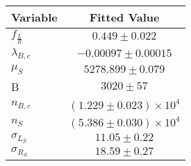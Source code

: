 \begin{tabular}[t]{lc}
\hline
Variable &Fitted Value\\
\hline\hline
$f_{\frac{L}{R}}$&$0.449\pm0.022$\\
\hline
$\lambda_{B,c}$&$-0.00097\pm0.00015$\\
\hline
$\mu_S$&$5278.899\pm0.079$\\
\hline
B&$3020\pm57$\\
\hline
$n_{B,c}$&$(1.229\pm0.023)\times 10^4$\\
\hline
$n_S$&$(5.386\pm0.030)\times 10^4$\\
\hline
$\sigma_{L_S}$&$11.05\pm0.22$\\
\hline
$\sigma_{R_S}$&$18.59\pm0.27$\\
\hline
\end{tabular}